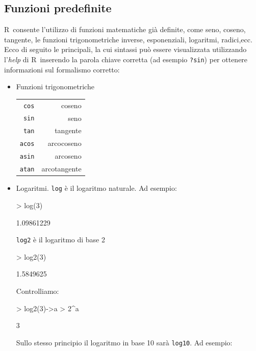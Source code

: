 \documentclass[onecolumn,11pt]{book}
\newcommand{\rpr}{\textsf{R}~}
\begin{document}
\subsection{Funzioni predefinite}  
\rpr consente l'utilizzo di funzioni matematiche gi\`a definite, come seno, coseno, tangente, le funzioni trigonometriche inverse, esponenziali, logaritmi, radici,ecc.
Ecco di seguito le principali, la cui sintassi pu\`o essere visualizzata utilizzando l'\emph {help} di \rpr inserendo la parola chiave corretta (ad esempio \texttt{?sin}) per ottenere informazioni sul formalismo corretto:  
\begin{itemize}
 \item{}
 Funzioni trigonometriche\hfill\vskip10pt
 \begin{tabular}{|r r |}\hline
\texttt{cos}&  coseno\\
\texttt{sin}& seno\\
\texttt{tan}&   tangente\\
\texttt{acos}&   arcocoseno\\
\texttt{asin}&   arcoseno\\
\texttt{atan} &  arcotangente\\
\hline
\end{tabular}
\item{}Logaritmi.\vskip10pt
\texttt{log} \`e il  logaritmo naturale. Ad esempio:
\begin{Schunk}
\begin{Sinput}
> log(3)
\end{Sinput}
\begin{Soutput}
[1] 1.09861229
\end{Soutput}
\end{Schunk}
\texttt{log2} \`e il logaritmo di base 2 
\begin{Schunk}
\begin{Sinput}
> log2(3)
\end{Sinput}
\begin{Soutput}
[1] 1.5849625
\end{Soutput}
\end{Schunk}
Controlliamo:  
\begin{Schunk}
\begin{Sinput}
> log2(3)->a
> 2^a
\end{Sinput}
\begin{Soutput}
[1] 3
\end{Soutput}
\end{Schunk}
Sullo stesso principio il logaritmo in base 10 sar\`a
\texttt{log10}. Ad
esempio:
\begin{Schunk}

\end{Schunk}
\end{itemize}
\end{document}
